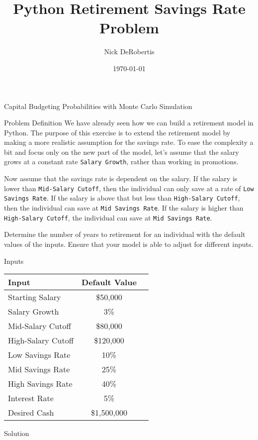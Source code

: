 \documentclass[]{article}
\begin{document}
\title{Python Retirement Savings Rate Problem}
\author{Nick DeRobertis}
\date{\today}
\maketitle
\begin{section}{Capital Budgeting Probabilities with Monte Carlo Simulation}
\begin{subsection}{Problem Definition}
We have already seen how we can build a retirement model in Python. The purpose of this exercise is to extend the
retirement model by making a more realistic assumption for the savings rate. To ease the complexity a bit and focus
only on the new part of the model, let's assume that the salary grows at a constant rate
\texttt{Salary Growth}, rather than working in promotions.

Now assume that the savings rate is dependent on the salary. If the salary is lower than
\texttt{Mid-Salary Cutoff}, then the individual can only save at a rate of
\texttt{Low Savings Rate}. If the salary is above that but less than \texttt{High-Salary Cutoff},
then the individual can save at \texttt{Mid Savings Rate}. If the salary is higher than
\texttt{High-Salary Cutoff}, the individual can save at \texttt{Mid Savings Rate}.

Determine the number of years to retirement for an individual with the default values of the inputs. Ensure that your
model is able to adjust for different inputs.

\end{subsection}
\begin{subsection}{Inputs}
\begin{center}
\begin{tabular}{l|cc}
\toprule
Input & Default Value\\

\midrule
Starting Salary & \$50,000\\
Salary Growth & 3\%\\
Mid-Salary Cutoff & \$80,000\\
High-Salary Cutoff & \$120,000\\
Low Savings Rate & 10\%\\
Mid Savings Rate & 25\%\\
High Savings Rate & 40\%\\
Interest Rate & 5\%\\
Desired Cash & \$1,500,000\\

\bottomrule
\end{tabular}
\end{center}
\end{subsection}
\begin{subsection}{Solution}


\end{subsection}
\end{section}
\end{document}
